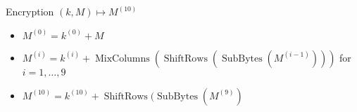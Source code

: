\documentclass{beamer}
\begin{document}
\begin{frame}{Encryption $(k,M) \mapsto M^{(10)}$} 
	\begin{itemize} 
		\item $M^{(0)} = k^{(0)} + M $
		\item $M^{(i)} = k^{(i)} + \operatorname{MixColumns} ( \operatorname{ShiftRows} (\operatorname{SubBytes} (M^{(i-1)})))$ for $i=1,\ldots,9$
		\item $M^{(10)}  = k^{(10)} + \operatorname{ShiftRows} ( \operatorname{SubBytes} (M^{(9)} )$ 
	\end{itemize} 
\end{frame} 
\end{document}
